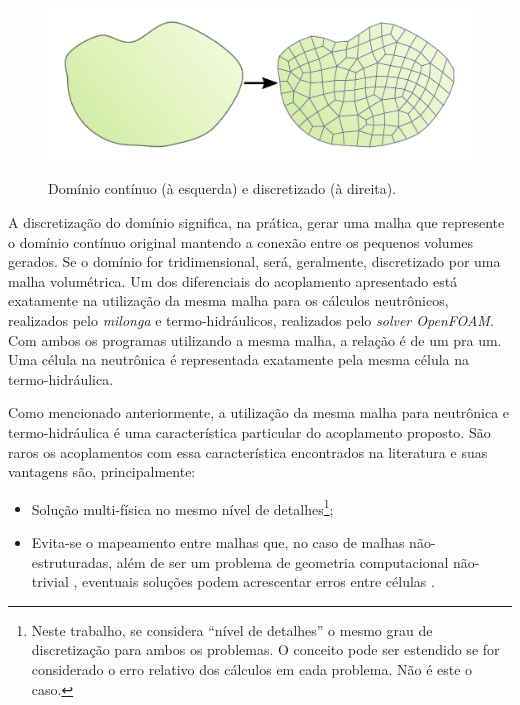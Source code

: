 \begin{figure}[htb]
  \caption[Domínio contínuo e discretizado.]{Domínio contínuo (à esquerda) e discretizado (à direita).}
  \centering\includegraphics[scale=1.3]{figuras/dom.png}
  \label{fig:dom}
\end{figure}

A discretização do domínio significa, na prática, gerar uma malha que represente o domínio contínuo original
mantendo a conexão entre os pequenos volumes gerados. Se o domínio for tridimensional, será, geralmente,
discretizado por uma malha volumétrica. Um dos diferenciais do acoplamento apresentado está exatamente na
utilização da mesma malha para os cálculos neutrônicos, realizados pelo \textit{milonga} e termo-hidráulicos,
realizados pelo \textit{solver OpenFOAM}. Com ambos os programas utilizando a mesma malha, a relação é de um
pra um. Uma célula na neutrônica é representada exatamente pela mesma célula na termo-hidráulica.

Como mencionado anteriormente, a utilização da mesma malha para neutrônica e
termo-hidráulica é uma característica
particular do acoplamento proposto. São raros os acoplamentos com essa característica
encontrados na literatura \cite{Jareteg2014} e suas vantagens são, principalmente:

\begin{itemize}
\item Solução multi-física no mesmo nível de detalhes\footnote{Neste trabalho, se considera ``nível de detalhes'' o
  mesmo grau de discretização para ambos os problemas. O conceito pode ser estendido se for
  considerado o erro relativo dos cálculos em cada problema. Não é este o caso.};
\item Evita-se o mapeamento entre malhas que, no caso de malhas não-estruturadas, além de ser um problema de
  geometria computacional não-trivial , eventuais soluções podem acrescentar
  erros entre células \cite{Kraevoy2004}.
\end{itemize}

